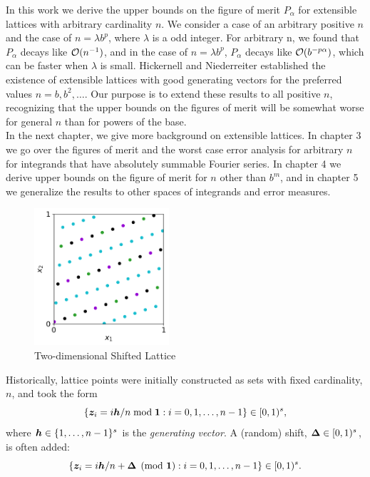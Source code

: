 \documentclass{iitthesis-au} %
\begin{document}
In this work we derive the upper bounds on the figure of merit $P_{\alpha}$ for extensible lattices with arbitrary cardinality $n$. We consider a case of an arbitrary positive $n$ and the case of $n = \lambda b^p$, where $\lambda$ is a odd integer. For arbitrary n, we found that $P_{\alpha}$ decays like $\operatorname{{\mathcal O}}(n^{-1})$, and in the case of $n = \lambda b^p$, $P_{\alpha}$ decays like $\operatorname{{\mathcal O}}(b^{-p \alpha})$, which can be faster when $\lambda$ is small. Hickernell and Niederreiter \cite{HicNie03a} established the existence of extensible lattices with good generating vectors for the preferred values $n = b, b^2, \ldots$.  Our purpose is to extend these results to all positive $n$, recognizing that the upper bounds on the figures of merit will be somewhat worse for general $n$ than for powers of the base. \\



   
In the next chapter, we give more background on extensible lattices. In chapter 3 we go over the figures of merit and the worst case error analysis for arbitrary $n$ for integrands that have absolutely summable Fourier series. In chapter 4 we derive upper bounds on the figure of merit %
for $n$ other than $b^m$, and in chapter 5 we generalize the results to other spaces of integrands and error measures. 


\begin{figure}[h]
\centering
\includegraphics[width=5cm]{lattice-plot.png}
\caption{Two-dimensional Shifted Lattice}
\label{fig:enter-label}
\end{figure}


Historically, lattice points were initially constructed as sets with fixed cardinality, $n$, and took the form
\begin{equation} \label{eq:lat}
    \{\boldsymbol{z}_i = i \boldsymbol{h}/n \bmod{\boldsymbol{1}} : i=0,1, \ldots, n-1 \} \in [0,1)^s,
\end{equation}
where $\boldsymbol{h} \in \{1, \ldots, n-1\}^s$ is the \emph{generating vector}.  A (random) shift, $\boldsymbol{\Delta} \in [0,1)^s$, is often added:
\begin{equation} \label{eq:shlat}
    \{\boldsymbol{z}_i = i \boldsymbol{h}/n + \boldsymbol{\Delta} \pmod{\boldsymbol{1}} : i=0,1, \ldots, n-1 \} \in [0,1)^s.
\end{equation}
\end{document}
